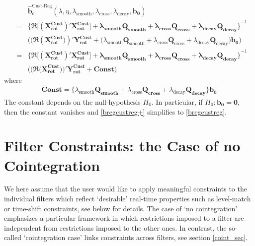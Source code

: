 \documentclass[11pt]{article}
\begin{document}
\begin{eqnarray}\label{bregcustreg+}
&&\mathbf{\hat{b}}^{\textrm{Cust-Reg}}_c(\lambda,\eta,\lambda_{\textrm{smooth}},\lambda_{\textrm{cross}},\lambda_{\textrm{decay}},\mathbf{b_0})\nonumber\\
&=&\mathbf{\Big\{\Re\Big[(X_{\textrm{rot}}^{\textrm{Cust} })' X_{\textrm{rot}}^{\textrm{Cust}}\Big]+
\lambda_{\textrm{smooth}}\mathbf{Q_{smooth}}+\lambda_{\textrm{cross}}\mathbf{Q_{cross}}+\lambda_{\textrm{decay}}\mathbf{Q_{decay}}
\Big\}}^{-1}\nonumber\\
&&\Bigg((\Re(\mathbf{X_{\textrm{rot}}^{\textrm{Cust}})})'
\mathbf{Y_{\textrm{rot}}^{\textrm{Cust}}}+
\Big(\lambda_{\textrm{smooth}}\mathbf{Q}_{\textrm{smooth}}+\lambda_{\textrm{cross}}\mathbf{Q}_{\textrm{cross}}+
\lambda_{\textrm{decay}}\mathbf{Q}_{\textrm{decay}}\Big)\mathbf{b_0}\Bigg)\nonumber\\
&=&\mathbf{\Big\{\Re\Big[(X_{\textrm{rot}}^{\textrm{Cust} })' X_{\textrm{rot}}^{\textrm{Cust}}\Big]+
\lambda_{\textrm{smooth}}\mathbf{Q_{smooth}}+\lambda_{\textrm{cross}}\mathbf{Q_{cross}}+\lambda_{\textrm{decay}}\mathbf{Q_{decay}}
\Big\}}^{-1}\nonumber\\
&&\Big((\Re(\mathbf{X_{\textrm{rot}}^{\textrm{Cust}}))}'
\mathbf{Y_{\textrm{rot}}^{\textrm{Cust}}}+\mathbf{Const}\Big)
\end{eqnarray}
where 
\begin{eqnarray*}
\mathbf{Const}=\Big\{\lambda_{\textrm{smooth}}\mathbf{Q_{\textrm{smooth}}}+\lambda_{\textrm{cross}}\mathbf{Q_{\textrm{cross}}}+
\lambda_{\textrm{decay}}\mathbf{Q_{\textrm{decay}}}\Big\}\mathbf{b_0}
\end{eqnarray*}
The constant depends on the null-hypothesis $H_0$. In particular, if $H_0: \mathbf{b_0=0}$, then the constant vanishes and \ref{bregcustreg+} simplifies to \ref{bregcustreg}.


\section{Filter Constraints: the Case of no Cointegration}\label{fco}

We here assume that the user would like to apply meaningful constraints to the individual filters which reflect `desirable' real-time properties such as level-match or time-shift constraints, see below for details. The case of `no cointegration' emphasizes a particular framework in which restrictions imposed to a filter are independent from restrictions imposed to the other ones. In contrast, the so-called `cointegration case' links constraints across filters, see section \ref{coint_sec}. 
\end{document}
